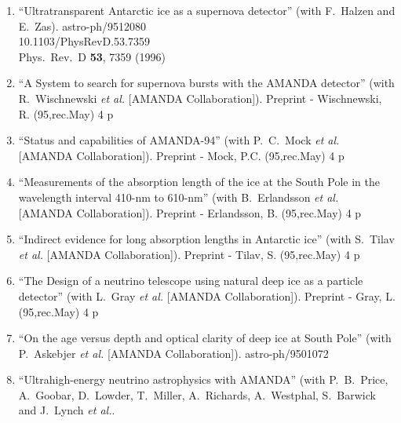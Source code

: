 \begin{enumerate}
\item ``Ultratransparent Antarctic ice as a supernova detector'' (with F.~Halzen and E.~Zas). astro-ph/9512080
    \\{}10.1103/PhysRevD.53.7359
\\{}Phys.\ Rev.\ D {\bf 53}, 7359 (1996) %


\item ``A System to search for supernova bursts with the AMANDA detector'' (with R.~Wischnewski {\it et al.}  [AMANDA Collaboration]). Preprint - Wischnewski, R. (95,rec.May) 4 p %


\item ``Status and capabilities of AMANDA-94'' (with P.~C.~Mock {\it et al.}  [AMANDA Collaboration]). Preprint - Mock, P.C. (95,rec.May) 4 p %


\item ``Measurements of the absorption length of the ice at the South Pole in the wavelength interval 410-nm to 610-nm'' (with B.~Erlandsson {\it et al.}  [AMANDA Collaboration]). Preprint - Erlandsson, B. (95,rec.May) 4 p %


\item ``Indirect evidence for long absorption lengths in Antarctic ice'' (with S.~Tilav {\it et al.}  [AMANDA Collaboration]). Preprint - Tilav, S. (95,rec.May) 4 p %


\item ``The Design of a neutrino telescope using natural deep ice as a particle detector'' (with L.~Gray {\it et al.}  [AMANDA Collaboration]). Preprint - Gray, L. (95,rec.May) 4 p %


\item ``On the age versus depth and optical clarity of deep ice at South Pole'' (with P.~Askebjer {\it et al.}  [AMANDA Collaboration]). astro-ph/9501072
  


\item ``Ultrahigh-energy neutrino astrophysics with AMANDA'' (with P.~B.~Price, A.~Goobar, D.~Lowder, T.~Miller, A.~Richards, A.~Westphal, S.~Barwick and J.~Lynch {\it et al.}.
  

\end{enumerate}

